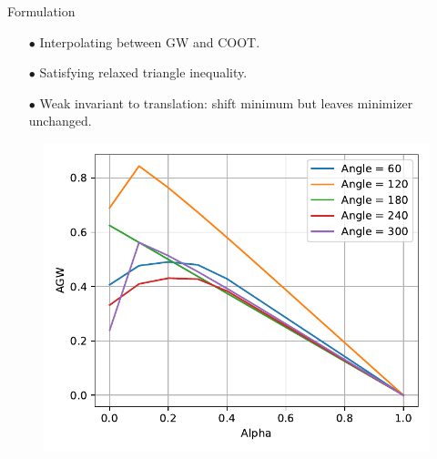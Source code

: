 \documentclass{beamer}
\begin{document}
\begin{frame}{Formulation}
\begin{minipage}[t]{0.55\linewidth}
  \begin{itemize}
    \item[$\bullet$] Interpolating between GW and COOT.
    \item[$\bullet$] Satisfying relaxed triangle inequality.
    \item[$\bullet$] Weak invariant to translation: shift minimum but leaves minimizer unchanged.
  \end{itemize}
  \end{minipage}%
  \hfill%
  \hspace{-6cm}
  \begin{minipage}[t]{0.45\linewidth}
    \vspace{-0.2cm}
  \begin{figure}
    \centering
    \includegraphics[width=1.15\linewidth, keepaspectratio=true]{OT_new/agw_alpha.pdf}
  \end{figure}
  \end{minipage}

\end{frame}
\end{document}
